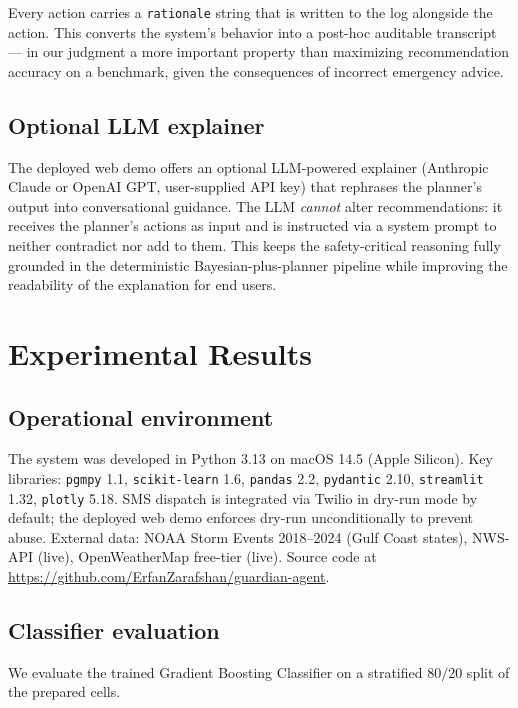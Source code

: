 \documentclass{article}
\theoremstyle{plain}
\theoremstyle{definition}
\theoremstyle{remark}
\begin{document}
Every action carries a \texttt{rationale} string that is written to the
log alongside the action. This converts the system's behavior into a
post-hoc auditable transcript --- in our judgment a more important
property than maximizing recommendation accuracy on a benchmark, given
the consequences of incorrect emergency advice.

\subsection{Optional LLM explainer}

The deployed web demo offers an optional LLM-powered explainer
(Anthropic Claude or OpenAI GPT, user-supplied API key) that
rephrases the planner's output into conversational guidance. The LLM
\emph{cannot} alter recommendations: it receives the planner's actions
as input and is instructed via a system prompt to neither contradict
nor add to them. This keeps the safety-critical reasoning fully
grounded in the deterministic Bayesian-plus-planner pipeline while
improving the readability of the explanation for end users.

\section{Experimental Results}
\label{sec:results}

\subsection{Operational environment}

The system was developed in Python 3.13 on macOS 14.5
(Apple Silicon). Key libraries:
\texttt{pgmpy} 1.1, \texttt{scikit-learn} 1.6, \texttt{pandas} 2.2,
\texttt{pydantic} 2.10, \texttt{streamlit} 1.32, \texttt{plotly} 5.18.
SMS dispatch is integrated via Twilio in dry-run mode by default; the
deployed web demo enforces dry-run unconditionally to prevent abuse.
External data: NOAA Storm Events 2018--2024 (Gulf Coast states),
NWS-API (live), OpenWeatherMap free-tier (live). Source code at
\url{https://github.com/ErfanZarafshan/guardian-agent}.

\subsection{Classifier evaluation}
\label{sec:classifier-eval}

We evaluate the trained Gradient Boosting Classifier on a stratified
$80/20$ split of the prepared cells.
\end{document}
